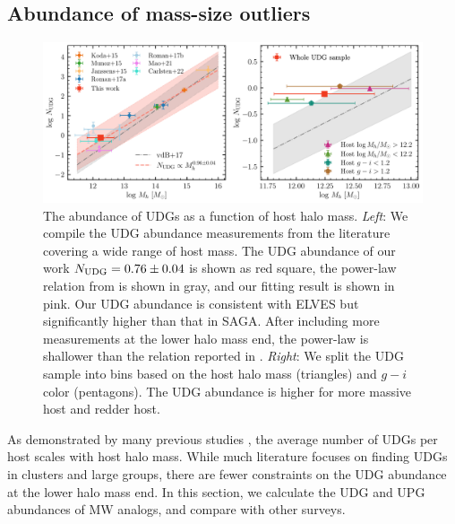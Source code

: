 \documentclass[twocolumn,astrosymb,twocolappendix]{aastex631}
\begin{document}
\begin{CJK*}{UTF8}{gbsn}

\subsection{Abundance of mass-size outliers}\label{sec:n_udg}

\begin{figure}
	\vbox{ 
		\centering
		\includegraphics[width=1\linewidth]{N_UDG_host_mass.pdf}
	}
    \caption{The abundance of UDGs as a function of host halo mass. \textit{Left}: We compile the UDG abundance measurements from the literature covering a wide range of host mass. The UDG abundance of our work $N_{\rm UDG} = 0.76\pm 0.04$ is shown as red square, the power-law relation from \citet{vdBurg2017} is shown in gray, and our fitting result is shown in pink. Our UDG abundance is consistent with ELVES but significantly higher than that in SAGA. After including more measurements at the lower halo mass end, the power-law is shallower than the relation reported in \citet{vdBurg2017}. \textit{Right}: We split the UDG sample into bins based on the host halo mass (triangles) and $g-i$ color (pentagons). The UDG abundance is higher for more massive host and redder host. }
    \label{fig:n_udg}
\end{figure}

As demonstrated by many previous studies \citep[e.g.,][]{vdBurg2016,vdBurg2017,Roman2017a,Karunakaran2022b}, the average number of UDGs per host scales with host halo mass. While much literature focuses on finding UDGs in clusters and large groups, there are fewer constraints on the UDG abundance at the lower halo mass end. In this section, we calculate the UDG and UPG abundances of MW analogs, and compare with other surveys.


\end{CJK*}
\end{document}
